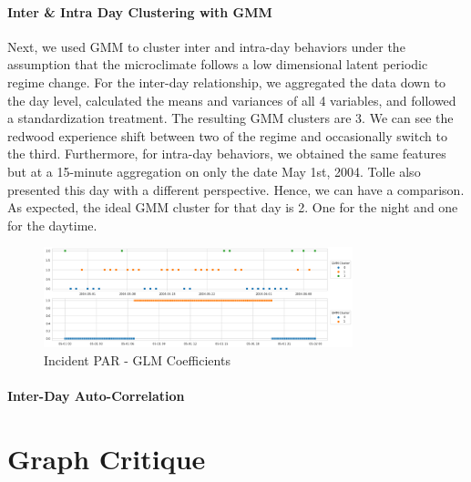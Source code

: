 \documentclass[11pt, letterpaper]{article}
\begin{document}
\paragraph{Inter \& Intra Day Clustering with GMM}
Next, we used GMM to cluster inter and intra-day behaviors under the assumption that the microclimate follows a low dimensional latent periodic regime change. For the inter-day relationship, we aggregated the data down to the day level, calculated the means and variances of all 4 variables, and followed a standardization treatment. The resulting GMM clusters are 3. We can see the redwood experience shift between two of the regime and occasionally switch to the third. Furthermore, for intra-day behaviors, we obtained the same features but at a 15-minute aggregation on only the date May 1st, 2004. Tolle also presented this day with a different perspective. Hence, we can have a comparison. As expected, the ideal GMM cluster for that day is 2. One for the night and one for the daytime.
\begin{figure}[h!]
\centering
\includegraphics[width=0.8\textwidth]{if_4.3.png}
\captionsetup{justification=centering}
\caption{Incident PAR - GLM Coefficients}
\label{fig:glm_coef}
\end{figure}

\paragraph{Inter-Day Auto-Correlation}




\section{Graph Critique}
\end{document}
